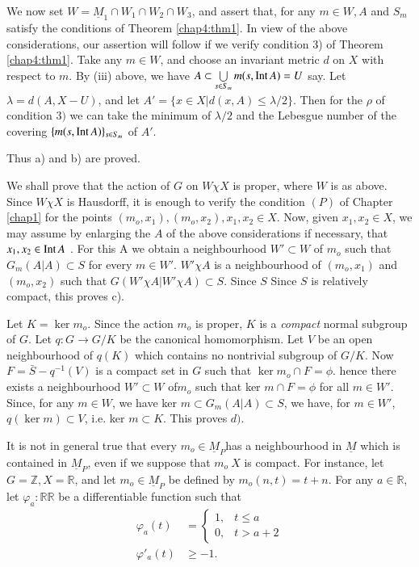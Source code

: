 We now set $W =\underline{M}_1 \cap W_1 \cap W_2 \cap W_3$, and assert
that, for any $m \in W, A$ and $S_m$ satisfy the conditions of Theorem
\ref{chap4:thm1}. In view of the above considerations, our assertion  will follow
if we verify condition 3) of Theorem \ref{chap4:thm1}. Take any $m \in W$, and
choose an invariant metric $d$ on $X$ with respect to $m$. By (iii)
above, we have $A \subset \bigcup\limits_{s \in S_m}m(s, \operatorname{Int} A)= U$
say. Let  $\lambda= d(A, X-U)$, and let $A'=\bigg\{x \in X |
d(x,A) \le \lambda/2 \bigg\}$. Then for the $\rho$ of condition
$3)$ we can take the minimum of $\lambda/2$ and the Lebesgue number of
the covering $\{ m(s, \operatorname{Int} A)\}_{s \in S_m}$ of $A'$. 

Thus a) and b) are proved.

\medskip
{} 
We shall prove that the action of $G$ on $W \chi X$ is proper, where
$W$ is as above.  Since $W \chi X$  is Hausdorff,  it is enough to
verify  the condition $(P)$ of Chapter \ref{chap1} for the points $(m_o, x_1),
(m_o,x_2), x_1,x_2 \in X$. Now, given $x_1, x_2 \in X$, we may assume
by enlarging the $A$ of the above considerations if necessary, that
$x_1, x_2 \in \operatorname{Int} A$ . For this A we obtain  a neighbourhood $W'
\subset W$ of $m_o$ such that  $G_m(A|A)\subset S$ for every $m \in
W'$. $W' \chi A$ is a neighbourhood of $(m_o,x_1)$ and $(m_o,x_2)$
such that $G(W' \chi A | W' \chi A) \subset S$. Since $S$ Since $S$ is
relatively  compact, this proves c).  

\medskip
{} Let $K = \ker m_o$. Since the action
$m_o$ is proper, $K$ is  a \textit{compact} normal subgroup of $G$. Let
$q: G \to G/K$ be the canonical homomorphism. Let $V$ be an open
neighbourhood of $q(K)$ which contains no nontrivial subgroup of
$G/K$. Now $F=\bar{S}-q^{-1}(V)$ is a compact set in $G$ such that
$\ker m_o  \cap F=\phi$. hence there exists a neighbourhood $W' \subset
W$ of\pageoriginale $m_o$ such that ker $m \cap F=\phi$ for all $m \in W'$.  Since,
for any $m \in W$, we have ker $m \subset G_m (A|A) \subset S$, we
have, for $m \in W'$, $	q(\ker m) \subset V$, i.e. ker $m \subset
K$. This proves $d)$. 

\setcounter{rem}{0}
\begin{rem}%
  It is not in general true that every $m_o  \in \underline{M}_P$has a
  neighbourhood in $\underline{M}$ which is contained in
  $\underline{M}_P$, even if we suppose that $m_o \ X$ is compact. For
  instance, let $G=  \mathbb{Z}, X= \mathbb{R}$, and let $m_o \in
  \underline{M}_P$ be defined by $m_o(n,t) = t+n$. For any  $a \in
  \mathbb{R}$, let $\varphi_a : \mathbb{R} \mathbb{R}$ be a
  differentiable function such that  
  \begin{align*}
    \varphi_a (t) &=
    \begin{cases}
      1, &t \le a\\
      0, & t > a+2
    \end{cases}\\
    \varphi'_a (t)  &\ge -1.
  \end{align*}
\end{rem}    

